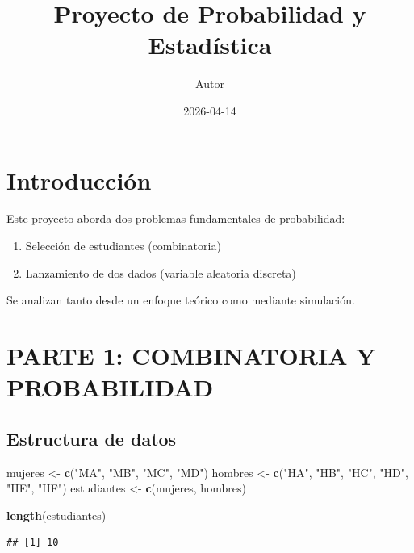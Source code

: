 \documentclass[
]{article}
\title{Proyecto de Probabilidad y Estadística}
\author{Autor}
\date{2026-04-14}
\newenvironment{Shaded}{\begin{snugshade}}{\end{snugshade}}
\newcommand{\FunctionTok}[1]{\textcolor[rgb]{0.13,0.29,0.53}{\textbf{#1}}}
\newcommand{\NormalTok}[1]{#1}
\newcommand{\OtherTok}[1]{\textcolor[rgb]{0.56,0.35,0.01}{#1}}
\newcommand{\StringTok}[1]{\textcolor[rgb]{0.31,0.60,0.02}{#1}}
\providecommand{\tightlist}{%
  \setlength{\itemsep}{0pt}\setlength{\parskip}{0pt}}
\begin{document}
\maketitle

{
\setcounter{tocdepth}{3}
\tableofcontents
}
\section{Introducción}\label{introducciuxf3n}

Este proyecto aborda dos problemas fundamentales de probabilidad:

\begin{enumerate}
\def\labelenumi{\arabic{enumi}.}
\tightlist
\item
  Selección de estudiantes (combinatoria)
\item
  Lanzamiento de dos dados (variable aleatoria discreta)
\end{enumerate}

Se analizan tanto desde un enfoque teórico como mediante simulación.

\section{PARTE 1: COMBINATORIA Y
PROBABILIDAD}\label{parte-1-combinatoria-y-probabilidad}

\subsection{Estructura de datos}\label{estructura-de-datos}

\begin{Shaded}
\begin{Highlighting}[]
\NormalTok{mujeres }\OtherTok{\textless{}{-}} \FunctionTok{c}\NormalTok{(}\StringTok{"MA"}\NormalTok{, }\StringTok{"MB"}\NormalTok{, }\StringTok{"MC"}\NormalTok{, }\StringTok{"MD"}\NormalTok{)}
\NormalTok{hombres }\OtherTok{\textless{}{-}} \FunctionTok{c}\NormalTok{(}\StringTok{"HA"}\NormalTok{, }\StringTok{"HB"}\NormalTok{, }\StringTok{"HC"}\NormalTok{, }\StringTok{"HD"}\NormalTok{, }\StringTok{"HE"}\NormalTok{, }\StringTok{"HF"}\NormalTok{)}
\NormalTok{estudiantes }\OtherTok{\textless{}{-}} \FunctionTok{c}\NormalTok{(mujeres, hombres)}

\FunctionTok{length}\NormalTok{(estudiantes)}
\end{Highlighting}
\end{Shaded}

\begin{verbatim}
## [1] 10
\end{verbatim}
\end{document}
